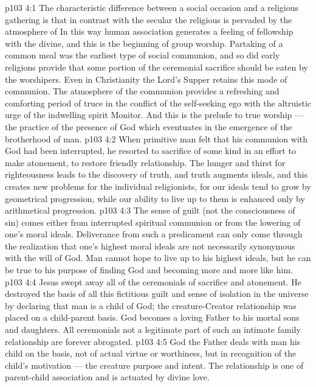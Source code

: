 \vs p103 4:1 The characteristic difference between a social occasion and a religious gathering is that in contrast with the secular the religious is pervaded by the atmosphere of  In this way human association generates a feeling of fellowship with the divine, and this is the beginning of group worship. Partaking of a common meal was the earliest type of social communion, and so did early religions provide that some portion of the ceremonial sacrifice should be eaten by the worshipers. Even in Christianity the Lord’s Supper retains this mode of communion. The atmosphere of the communion provides a refreshing and comforting period of truce in the conflict of the self\hyp{}seeking ego with the altruistic urge of the indwelling spirit Monitor. And this is the prelude to true worship --- the practice of the presence of God which eventuates in the emergence of the brotherhood of man.
\vs p103 4:2 When primitive man felt that his communion with God had been interrupted, he resorted to sacrifice of some kind in an effort to make atonement, to restore friendly relationship. The hunger and thirst for righteousness leads to the discovery of truth, and truth augments ideals, and this creates new problems for the individual religionists, for our ideals tend to grow by geometrical progression, while our ability to live up to them is enhanced only by arithmetical progression.
\vs p103 4:3 The sense of guilt (not the consciousness of sin) comes either from interrupted spiritual communion or from the lowering of one’s moral ideals. Deliverance from such a predicament can only come through the realization that one’s highest moral ideals are not necessarily synonymous with the will of God. Man cannot hope to live up to his highest ideals, but he can be true to his purpose of finding God and becoming more and more like him.
\vs p103 4:4 Jesus swept away all of the ceremonials of sacrifice and atonement. He destroyed the basis of all this fictitious guilt and sense of isolation in the universe by declaring that man is a child of God; the creature\hyp{}Creator relationship was placed on a child\hyp{}parent basis. God becomes a loving Father to his mortal sons and daughters. All ceremonials not a legitimate part of such an intimate family relationship are forever abrogated.
\vs p103 4:5 God the Father deals with man his child on the basis, not of actual virtue or worthiness, but in recognition of the child’s motivation --- the creature purpose and intent. The relationship is one of parent\hyp{}child association and is actuated by divine love.
